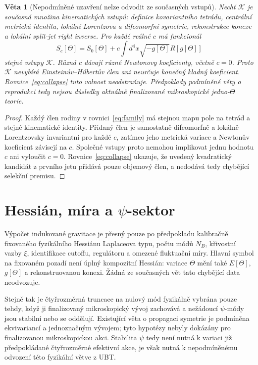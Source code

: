 \documentclass[11pt,a4paper]{article}
\newtheorem{theorem}{Věta}
\begin{document}
\begin{theorem}[Nepodmíněné uzavření nelze odvodit ze současných vstupů]
Nechť $\mathcal K$ je současná množina kinematických vstupů: definice
kovariantního tetrádu, centrální metrická identita, lokální Lorentzova a
difeomorfní symetrie, rekonstrukce konexe a lokální split-jet right inverse.
Pro každé reálné $c$ má funkcionál
\begin{equation}\label{eq:family}
 S_c[\Theta]=S_0[\Theta]+c\int d^4x\sqrt{-g[\Theta]}
 R[g[\Theta]]
\end{equation}
stejné vstupy $\mathcal K$. Různá $c$ dávají různé Newtonovy koeficienty,
včetně $c=0$. Proto $\mathcal K$ nevybírá Einsteinův--Hilbertův člen ani
neurčuje konečný kladný koeficient. Rovnice~\eqref{eq:collapse} tuto volnost
neodstraňuje. Předpoklady podmíněné věty o reprodukci tedy nejsou důsledky
aktuálně finalizované mikroskopické jedno-$\Theta$ teorie.
\end{theorem}
\begin{proof}
Každý člen rodiny v rovnici~\eqref{eq:family} má stejnou mapu pole na tetrád a
stejné kinematické identity. Přidaný člen je samostatně difeomorfně a lokálně
Lorentzovsky invariantní pro každé $c$, zatímco jeho metrická variace a
Newtonův koeficient závisejí na $c$. Společné vstupy proto nemohou implikovat
jednu hodnotu $c$ ani vyloučit $c=0$. Rovnice~\eqref{eq:collapse} ukazuje, že
uvedený kvadratický kandidát z prvního jetu přidává pouze objemový člen, a
nedodává tedy chybějící selekční premisu.
\end{proof}

\section{Hessián, míra a $\psi$-sektor}
Výpočet indukované gravitace je přesný pouze po předpokladu kalibračně
fixovaného fyzikálního Hessiánu Laplaceova typu, počtu módů $N_B$, křivostní
vazby $\xi$, identifikace cutoffu, regulátoru a omezené fluktuační míry.
Hlavní symbol na fixovaném pozadí není úplný kompozitní Hessián: variace
$\Theta$ mění také $E[\Theta]$, $g[\Theta]$ a rekonstruovanou konexi. Žádná ze
současných vět tato chybějící data neodvozuje.

Stejně tak je čtyřrozměrná truncace na nulový mód fyzikálně vybrána pouze
tehdy, když ji finalizovaný mikroskopický vývoj zachovává a nežádoucí
$\psi$-módy jsou stabilní nebo se oddělují. Existující věta o propagaci
symetrie je podmíněna ekvivariancí a jednoznačným vývojem; tyto hypotézy nebyly
dokázány pro finalizovanou mikroskopickou akci. Stabilita $\psi$ tedy není
nutná k variaci již předpokládané čtyřrozměrné efektivní akce, je však nutná k
nepodmíněnému odvození této fyzikální větve z UBT.
\end{document}
